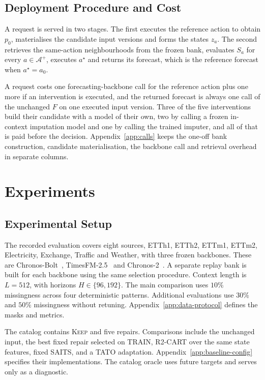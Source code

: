\documentclass{article}
\newcommand{\calA}{\mathcal{A}}
\begin{document}
\subsection{Deployment Procedure and Cost}
\label{sec:method-deploy}
A request is served in two stages. The first executes the reference action to obtain $p_0$,
materialises the candidate input versions and forms the states $z_a$. The second retrieves the
same-action neighbourhoods from the frozen bank, evaluates $S_a$ for every $a \in \calA^{+}$,
executes $a^{\star}$ and returns its forecast, which is the reference forecast when
$a^{\star} = a_0$.

A request costs one forecasting-backbone call for the reference action plus one more if an
intervention is executed, and the returned forecast is always one call of the unchanged $F$ on
one executed input version. Three of the five interventions build their candidate with a model
of their own, two by calling a frozen in-context imputation model and one by calling the
trained imputer, and all of that is paid before the decision.
Appendix~\ref{app:calls} keeps the one-off bank construction, candidate materialisation, the
backbone call and retrieval overhead in separate columns.

\section{Experiments}
\label{sec:exp}

\subsection{Experimental Setup}
\label{sec:exp-setup}
The recorded evaluation covers eight sources, ETTh1, ETTh2, ETTm1, ETTm2, Electricity,
Exchange, Traffic and Weather, with three frozen backbones. These are
Chronos-Bolt~\citep{chronosbolt2025}, TimesFM-2.5~\citep{das2024timesfm} and
Chronos-2~\citep{chronos2_2025}. A separate replay bank is built for each backbone using the
same selection procedure. Context length is $L=512$, with horizons $H \in \{96,192\}$.
The main comparison uses $10\%$ missingness across four deterministic patterns.
Additional evaluations use $30\%$ and $50\%$ missingness without retuning.
Appendix~\ref{app:data-protocol} defines the masks and metrics.

The catalog contains \textsc{Keep} and five repairs. Comparisons include the unchanged input,
the best fixed repair selected on TRAIN, R2-CART over the same state features, fixed SAITS,
and a TATO adaptation. Appendix~\ref{app:baseline-config} specifies their implementations.
The catalog oracle uses future targets and serves only as a diagnostic.
\end{document}
